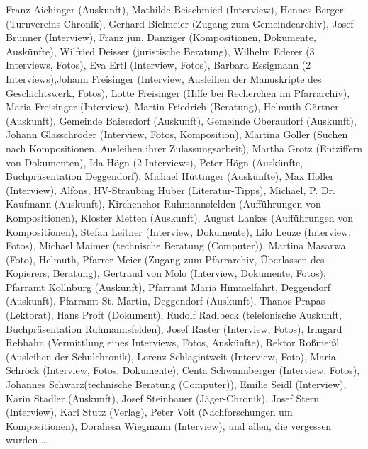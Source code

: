 Franz Aichinger (Auskunft),
Mathilde Beischmied (Interview),
Hennes Berger (Turnvereins-Chronik),
Gerhard Bielmeier (Zugang zum Gemeindearchiv),
Josef Brunner (Interview),
Franz jun. Danziger (Kompositionen, Dokumente, Auskünfte),
Wilfried Deisser (juristische Beratung),
Wilhelm Ederer (3 Interviews, Fotos),
Eva Ertl (Interview, Fotos),
Barbara Essigmann (2 Interviews),Johann Freisinger (Interview, Ausleihen der Manuskripte des Geschichtswerk, Fotos),
Lotte Freisinger (Hilfe bei Recherchen im Pfarrarchiv),
Maria Freisinger (Interview),
Martin Friedrich (Beratung),
Helmuth Gärtner (Auskunft),
Gemeinde Baiersdorf (Auskunft),
Gemeinde Oberaudorf (Auskunft),
Johann Glasschröder (Interview, Fotos, Komposition),
Martina Goller (Suchen nach Kompositionen, Ausleihen ihrer Zulassungsarbeit),
Martha Grotz (Entziffern von Dokumenten),
Ida Högn (2 Interviews),
Peter Högn (Auskünfte, Buchpräsentation Deggendorf),
Michael Hüttinger (Auskünfte),
Max Holler (Interview),
Alfons, HV-Straubing Huber (Literatur-Tipps),
Michael, P. Dr. Kaufmann (Auskunft),
Kirchenchor Ruhmannsfelden (Aufführungen von Kompositionen),
Kloster Metten (Auskunft),
August Lankes (Aufführungen von Kompositionen),
Stefan Leitner (Interview, Dokumente),
Lilo Leuze (Interview, Fotos),
Michael Maimer (technische Beratung (Computer)),
Martina Masarwa (Foto),
Helmuth, Pfarrer Meier (Zugang zum Pfarrarchiv, Überlassen des Kopierers, Beratung),
Gertraud von Molo (Interview, Dokumente, Fotos),
Pfarramt Kollnburg (Auskunft),
Pfarramt Mariä Himmelfahrt, Deggendorf (Auskunft),
Pfarramt St. Martin, Deggendorf (Auskunft),
Thanos Prapas (Lektorat),
Hans Proft (Dokument),
Rudolf Radlbeck (telefonische Auskunft, Buchpräsentation Ruhmannsfelden),
Josef Raster (Interview, Fotos),
Irmgard Rebhahn (Vermittlung eines Interviews, Fotos, Auskünfte),
Rektor Roßmeißl (Ausleihen der Schulchronik),
Lorenz Schlagintweit (Interview, Foto),
Maria Schröck (Interview, Fotos, Dokumente),
Centa Schwannberger (Interview, Fotos),
Johannes Schwarz(technische Beratung (Computer)),
Emilie Seidl (Interview),
Karin Stadler (Auskunft),
Josef Steinbauer (Jäger-Chronik),
Josef Stern (Interview),
Karl Stutz (Verlag),
Peter Voit (Nachforschungen um Kompositionen),
Doraliesa Wiegmann (Interview),
und allen, die vergessen wurden …